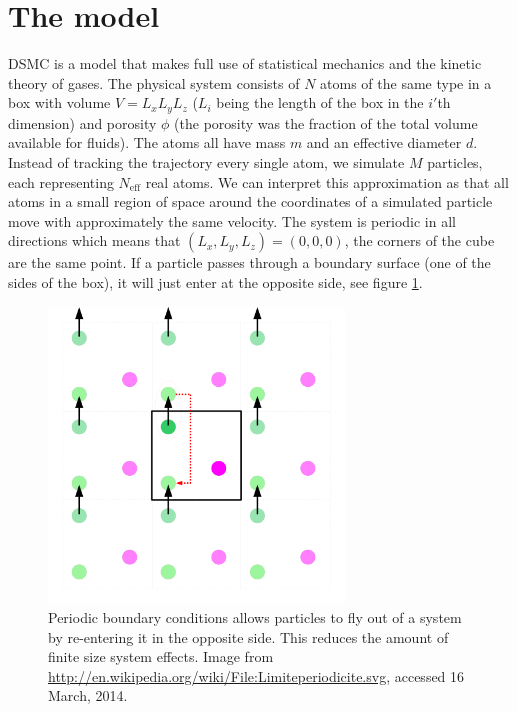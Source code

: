 \section{The model}
\label{sec:dsmc_model}
DSMC is a model that makes full use of statistical mechanics and the kinetic theory of gases. The physical system consists of $N$ atoms of the same type in a box with volume $V = L_xL_yL_z$ ($L_i$ being the length of the box in the $i'$th dimension) and porosity $\phi$ (the porosity was the fraction of the total volume available for fluids). The atoms all have mass $m$ and an effective diameter $d$. Instead of tracking the trajectory every single atom, we simulate $M$ particles, each representing $N_\text{eff}$ real atoms. We can interpret this approximation as that all atoms in a small region of space around the coordinates of a simulated particle move with approximately the same velocity. The system is periodic in all directions which means that $(L_x, L_y, L_z) = (0,0,0)$, the corners of the cube are the same point. If a particle passes through a boundary surface (one of the sides of the box), it will just enter at the opposite side, see figure \ref{fig:dsmc_periodic_boundary_conditions}. 
\begin{figure}[ht]
\begin{center}
\includegraphics[width=0.7\textwidth, trim=0cm 0cm 0cm 0cm]{DSMC/figures/periodic_boundary_conditions.png}
\end{center}
\caption{Periodic boundary conditions allows particles to fly out of a system by re-entering it in the opposite side. This reduces the amount of finite size system effects. Image from \url{http://en.wikipedia.org/wiki/File:Limiteperiodicite.svg}, accessed 16 March, 2014.}
\label{fig:dsmc_periodic_boundary_conditions}
\end{figure}
